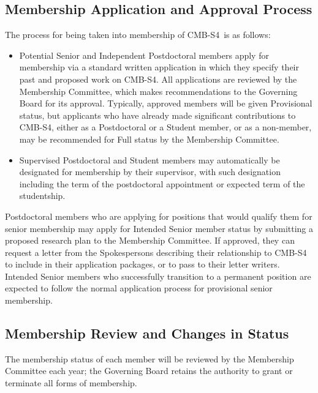\documentclass[12pt]{article}
\newcommand\collabname{CMB-S4}
\begin{document}
\subsection{Membership Application and Approval Process}

The process for being taken into membership of \collabname\ is as follows:

\begin{itemize}

\item Potential Senior and Independent Postdoctoral members apply for membership via a standard written application in which they specify their past and proposed work on \collabname. All applications are reviewed by the Membership Committee, which makes recommendations to the Governing Board for its approval. Typically, approved members will be given Provisional status, but applicants who have already made significant contributions to CMB-S4, either as a Postdoctoral or a Student member, or as a non-member, may be recommended for Full status by the Membership Committee.

\item Supervised Postdoctoral and Student members may automatically be designated for membership by their supervisor, with such designation including the term of the postdoctoral appointment or expected term of the studentship.

\end{itemize}

Postdoctoral members who are applying for positions that would qualify them for senior membership may apply for Intended Senior member status by submitting a proposed research plan to the Membership Committee. If approved, they can request a letter from the Spokespersons describing their relationship to CMB-S4 to include in their application packages, or to pass to their letter writers.  Intended Senior members who successfully transition to a permanent position are expected to follow the normal application process for provisional senior membership.

\subsection{Membership Review and Changes in Status}

The membership status of each member will be reviewed by the Membership Committee each year; the Governing Board retains the authority to grant or terminate all forms of membership.
\end{document}
